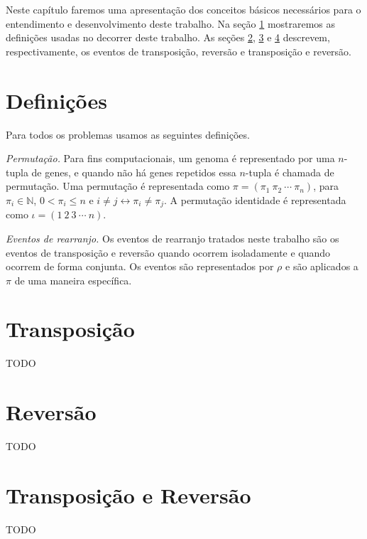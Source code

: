 Neste capítulo faremos uma apresentação dos conceitos básicos
necessários para o entendimento e desenvolvimento deste trabalho. Na
seção \ref{sec:defin} mostraremos as definições usadas no decorrer
deste trabalho. As seções \ref{sec:trans}, \ref{sec:rev} e
\ref{sec:trans_rev} descrevem, respectivamente, os eventos de
transposição, reversão e transposição e reversão.

\section{Definições}
\label{sec:defin}

Para todos os problemas usamos as seguintes definições.

\textit{Permutação.} Para fins computacionais,
um genoma é representado por uma $n$-tupla de genes, e quando não há
genes repetidos essa $n$-tupla é chamada de permutação. Uma permutação
é representada como $\pi = ( \pi_{1}~\pi_{2}~\cdots~\pi_{n} )$, para
$\pi_{i} \in \mathbb{N}$, $0 < \pi_{i} \leq n$ e $i \neq j
\leftrightarrow \pi_{i} \neq \pi_{j}$. A permutação identidade é
representada como $\iota = (1~2~3~\cdots~n)$.

\textit{Eventos de rearranjo.} Os eventos de rearranjo tratados neste
trabalho são os eventos de transposição e reversão quando ocorrem
isoladamente e quando ocorrem de forma conjunta. Os eventos são
representados por $\rho$ e são aplicados a $\pi$ de uma maneira
específica.

\section{Transposição}
\label{sec:trans}
TODO

\section{Reversão}
\label{sec:rev}
TODO

\section{Transposição e Reversão}
\label{sec:trans_rev}
TODO
